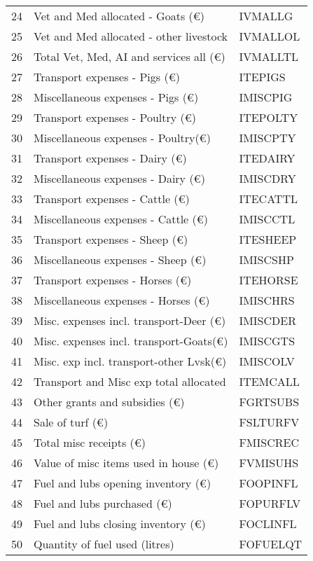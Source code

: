 \documentclass{article}\usepackage{graphicx, color}
\begin{document}
\begin{flushleft}
\begin{table}[ht]
\begin{center}
\begin{tabular}{rll}
  24 & Vet and Med allocated - Goats   (€) & IVMALLG \\ 
  25 & Vet and Med allocated - other livestock & IVMALLOL \\ 
  26 & Total Vet, Med, AI and services all (€) & IVMALLTL \\ 
  27 & Transport expenses - Pigs       (€) & ITEPIGS \\ 
  28 & Miscellaneous expenses - Pigs   (€) & IMISCPIG \\ 
  29 & Transport expenses - Poultry    (€) & ITEPOLTY \\ 
  30 & Miscellaneous expenses - Poultry(€) & IMISCPTY \\ 
  31 & Transport expenses - Dairy      (€) & ITEDAIRY \\ 
  32 & Miscellaneous expenses - Dairy  (€) & IMISCDRY \\ 
  33 & Transport expenses - Cattle     (€) & ITECATTL \\ 
  34 & Miscellaneous expenses - Cattle (€) & IMISCCTL \\ 
  35 & Transport expenses - Sheep      (€) & ITESHEEP \\ 
  36 & Miscellaneous expenses - Sheep  (€) & IMISCSHP \\ 
  37 & Transport expenses - Horses     (€) & ITEHORSE \\ 
  38 & Miscellaneous expenses - Horses (€) & IMISCHRS \\ 
  39 & Misc. expenses incl. transport-Deer (€) & IMISCDER \\ 
  40 & Misc. expenses incl. transport-Goats(€) & IMISCGTS \\ 
  41 & Misc. exp incl. transport-other Lvsk(€) & IMISCOLV \\ 
  42 & Transport and Misc exp total allocated & ITEMCALL \\ 
  43 & Other grants and subsidies      (€) & FGRTSUBS \\ 
  44 & Sale of turf                    (€) & FSLTURFV \\ 
  45 & Total misc receipts             (€) & FMISCREC \\ 
  46 & Value of misc items used in house (€) & FVMISUHS \\ 
  47 & Fuel and lubs opening inventory   (€) & FOOPINFL \\ 
  48 & Fuel and lubs purchased           (€) & FOPURFLV \\ 
  49 & Fuel and lubs closing inventory   (€) & FOCLINFL \\ 
  50 & Quantity of fuel used        (litres) & FOFUELQT \\ 
   \hline
\end{tabular}
\end{center}
\end{table}



\end{flushleft}
\end{document}
